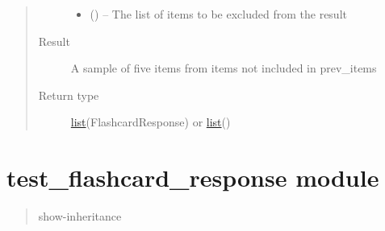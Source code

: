\documentclass[letterpaper,10pt,english]{sphinxmanual}
\begin{document}
\begin{fulllineitems}
\begin{fulllineitems}
\begin{quote}
\begin{description}
\begin{itemize}
\item {} 
 (\href{https://docs.python.org/2/library/functions.html\#list}{}\href{https://docs.python.org/2/library/functions.html\#list}{}\sphinxstyleliteralemphasis{)}\sphinxstyleliteralemphasis{}) -- The list of items to be excluded from the result

\end{itemize}

\item[{Result}] \leavevmode
A sample of five items from items not included in prev\_items

\item[{Return type}] \leavevmode
\href{https://docs.python.org/2/library/functions.html\#list}{list}(FlashcardResponse) or \href{https://docs.python.org/2/library/functions.html\#list}{list}({\hyperref[\detokenize{test_item_response:test_item_response.TestItemResponse}]{}})

\end{description}\end{quote}

\end{fulllineitems}


\end{fulllineitems}



\chapter{test\_flashcard\_response module}
\label{\detokenize{test_flashcard_response:test-flashcard-response-module}}\label{\detokenize{test_flashcard_response:module-test_flashcard_response}}\label{\detokenize{test_flashcard_response::doc}}\begin{quote}\begin{description}
\item[{show-inheritance}] \leavevmode
\end{description}\end{quote}
\end{document}
